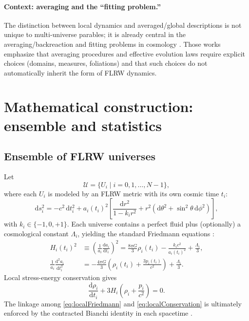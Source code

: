 \documentclass[11pt]{article}
\begin{document}
\paragraph{Context: averaging and the ``fitting problem.''}
The distinction between local dynamics and averaged/global descriptions is not unique to multi-universe parables; it is already central in the averaging/backreaction and fitting problems in cosmology \citep{Buchert2000,ClarksonEtAl2011}. Those works emphasize that averaging procedures and effective evolution laws require explicit choices (domains, measures, foliations) and that such choices do not automatically inherit the form of FLRW dynamics.

\medskip
\noindent{}

\section{Mathematical construction: ensemble and statistics}

\subsection{Ensemble of FLRW universes}

Let
\[
\mathcal{U}=\{U_i \mid i=0,1,\dots,N-1\},
\]
where each $U_i$ is modeled by an FLRW metric with its own cosmic time $t_i$:
\begin{equation}
\mathrm{d}s_i^2=-c^2\,\mathrm{d}t_i^2+a_i(t_i)^2\left[\frac{\mathrm{d}r^2}{1-k_i r^2}+r^2(\mathrm{d}\theta^2+\sin^2\theta\,\mathrm{d}\phi^2)\right],
\end{equation}
with $k_i\in\{-1,0,+1\}$.
Each universe contains a perfect fluid plus (optionally) a cosmological constant $\Lambda_i$, yielding the standard Friedmann equations \citep{Weinberg2008,Mukhanov2005,Dodelson2003}:
\begin{align}
H_i(t_i)^2 &\equiv \left(\frac{1}{a_i}\frac{\mathrm{d}a_i}{\mathrm{d}t_i}\right)^2
= \frac{8\pi G}{3}\rho_i(t_i) - \frac{k_i c^2}{a_i(t_i)^2} + \frac{\Lambda_i}{3}, \label{eq:localFriedmann}\\[4pt]
\frac{1}{a_i}\frac{\mathrm{d}^2 a_i}{\mathrm{d}t_i^2}
&= -\frac{4\pi G}{3}\!\left(\rho_i(t_i)+\frac{3p_i(t_i)}{c^2}\right)+\frac{\Lambda_i}{3}.
\end{align}
Local stress-energy conservation gives
\begin{equation}
\frac{\mathrm{d}\rho_i}{\mathrm{d}t_i} + 3H_i\!\left(\rho_i+\frac{p_i}{c^2}\right)=0. \label{eq:localConservation}
\end{equation}
The linkage among \eqref{eq:localFriedmann} and \eqref{eq:localConservation} is ultimately enforced by the contracted Bianchi identity in each spacetime \citep{Wald1984}.
\end{document}
